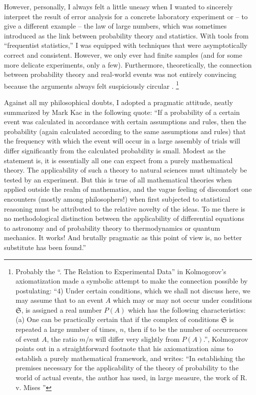 \documentclass{article}
\theoremstyle{definition}
\begin{document}
However, personally, I always felt a little uneasy when I wanted to sincerely interpret the result of error analysis for a concrete laboratory experiment or -- to give a different example -- the law of large numbers, which was sometimes introduced as the link between probability theory and statistics.
With tools from ``frequentist statistics,'' I was equipped with techniques that were asymptotically correct and consistent. However, we only ever had finite samples (and for some more delicate experiments, only a few).
Furthermore, theoretically, the connection between probability theory and real-world events was not entirely convincing because the arguments always felt suspiciously circular \cite{book:UniversalArtificialIntelligence}. \footnote{Probably the ``. The Relation to Experimental Data'' in Kolmogorov's axiomatization \cite{book:Kolmogorov} made a symbolic attempt to make the connection possible by postulating: ``4)
Under certain conditions, which we shall not discuss here, we may assume that to an event $A$ which may or may not occur under conditions $\mathfrak{S}$, is assigned a real number $P(A)$ which has
the following characteristics:
(a) One can be practically certain that if the complex of conditions $\mathfrak{S}$ is repeated a large number of times, $n$, then if to be the number of occurrences of event $A$, the ratio $m /n$ will differ very
slightly from $P(A)$.'', Kolmogorov points out in a straightforward footnote that his axiomatization aims to establish a purely mathematical framework, and writes: ``In establishing the premises
necessary for the applicability of the theory of probability to the world of
actual events, the author has used, in large measure, the work of R. v. Mises \cite{book:VonMises}''}

Against all my philosophical doubts, I adopted a pragmatic attitude, neatly summarized by Mark Kac in the following quote:
``If a probability of a certain event was calculated in accordance
with certain assumptions and rules, then the probability (again
calculated according to the same assumptions and rules) that the
frequency with which the event will occur in a large assembly of
trials will differ significantly from the calculated probability is
small.
Modest as the statement is, it is essentially all one can expect
from a purely mathematical theory.
The applicability of such a theory to natural sciences must
ultimately be tested by an experiment. But this is true of all
mathematical theories when applied outside the realm of mathematics, and the vague feeling of discomfort one encounters (mostly
among philosophers!) when first subjected to statistical reasoning
must be attributed to the relative novelty of the ideas.
To me there is no methodological distinction between the
applicability of differential equations to astronomy and of probability theory to thermodynamics or quantum mechanics.
It works! And brutally pragmatic as this point of view is, no
better substitute has been found.'' \cite{book:Kac}
\end{document}
